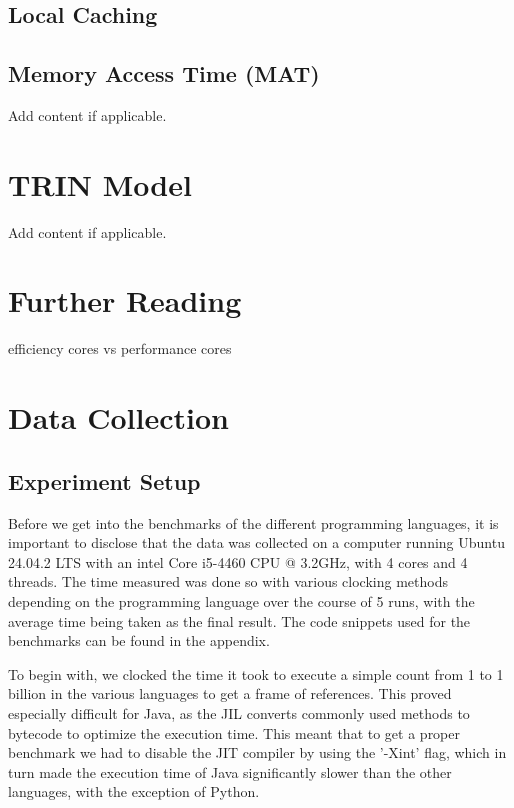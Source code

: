 \documentclass[12pt,a4paper]{article}
\begin{document}
\subsection{Local Caching}

\subsection{Memory Access Time (MAT)}

Add content if applicable.

\section{TRIN Model}

Add content if applicable.

\section{Further Reading}

efficiency cores vs performance cores

\section{Data Collection}

\subsection{Experiment Setup}

Before we get into the benchmarks of the different programming languages, it is important to disclose that the data was collected on a computer running Ubuntu 24.04.2 LTS with an intel Core i5-4460 CPU @ 3.2GHz, with 4 cores and 4 threads. The time measured was done so with various clocking methods depending on the programming language over the course of 5 runs, with the average time being taken as the final result. The code snippets used for the benchmarks can be found in the appendix.

To begin with, we clocked the time it took to execute a simple count from 1 to 1 billion in the various languages to get a frame of references. This proved especially difficult for Java, as the JIL converts commonly used methods to bytecode to optimize the execution time. This meant that to get a proper benchmark we had to disable the JIT compiler by using the '-Xint' flag, which in turn made the execution time of Java significantly slower than the other languages, with the exception of Python.
\end{document}
